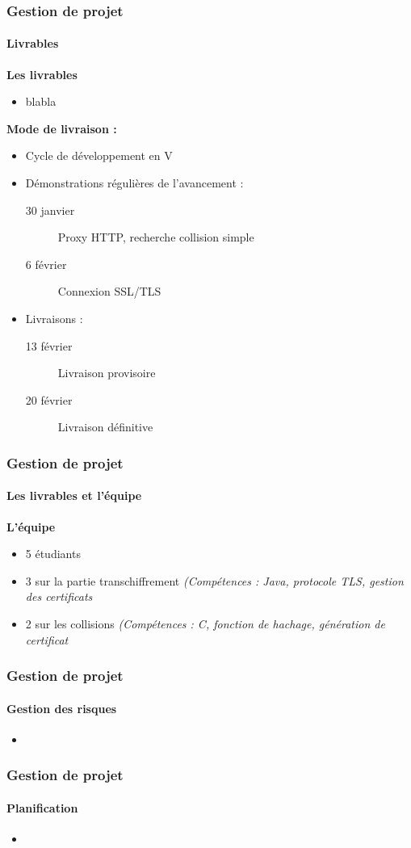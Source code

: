 \begin{frame}
\frametitle{Gestion de projet}
\framesubtitle{Livrables}
\textbf{Les livrables}
\begin{itemize}
\item blabla
\end{itemize}

\textbf{Mode de livraison :}
\begin{itemize}
\item Cycle de développement en V
\item Démonstrations régulières de l'avancement :
\begin{description}

\item[30 janvier] Proxy HTTP, recherche collision simple
\item[6 février] Connexion SSL/TLS
\end{description}

\item Livraisons :
\begin{description}
\item[13 février] Livraison provisoire
\item[20 février] Livraison définitive
\end{description}
\end{itemize}

\end{frame}



\begin{frame}
\frametitle{Gestion de projet}
\framesubtitle{Les livrables et l'équipe}
\textbf{L'équipe}
\begin{itemize}
\item 5 étudiants
\item 3 sur la partie transchiffrement \textit{(Compétences : Java, protocole TLS, gestion des certificats}
\item 2 sur les collisions
\textit{(Compétences : C, fonction de hachage, génération de certificat}
\end{itemize}
\end{frame}


\begin{frame}
\frametitle{Gestion de projet}
\framesubtitle{Gestion des risques}
\begin{itemize}
\item 
\end{itemize}
\end{frame}


\begin{frame}
\frametitle{Gestion de projet}
\framesubtitle{Planification}
\begin{itemize}
\item 
\end{itemize}
\end{frame}
